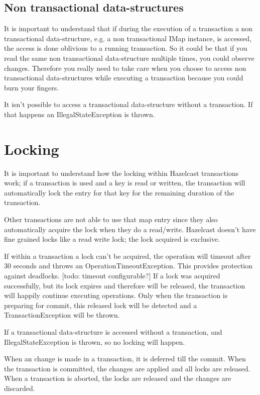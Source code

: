 \subsection*{Non transactional data-structures}
It is important to understand that if during the execution of a transaction a non transactional data-structure, e.g. a non transactional IMap instance, is accessed, the access is done oblivious to a running transaction. So it could be that if you read the same non transactional data-structure multiple times, you could observe changes. Therefore you really need to take care when you choose to access non transactional data-structures while executing a transaction because you could burn your fingers.

It isn't possible to access a transactional data-structure without a transaction. If that happens an IllegalStateException is thrown.

\section{Locking}
It is important to understand how the locking within Hazelcast transactions work; if a transaction is used and a key is read or written, the transaction will automatically lock the entry for that key for the remaining duration of the transaction. 


Other transactions are not able to use that map entry since they also automatically acquire the lock when they do a read/write. Hazelcast doesn't have fine grained locks like a read write lock; the lock acquired is exclusive.

If within a transaction a lock can't be acquired, the operation will timeout after 30 seconds and throws an OperationTimeoutException. This provides protection against deadlocks. [todo: timeout configurable?] If a lock was acquired successfully, but its lock expires and therefore will be released, the transaction will happily continue executing operations. Only when the transaction is preparing for commit, this released lock will be detected and a TransactionException will be thrown.

If a transactional data-structure is accessed without a transaction, and IllegalStateException is thrown, so no locking will happen. 

When an change is made in a transaction, it is deferred till the commit. When the transaction is committed, the changes are applied and all locks are released. When a transaction is aborted, the locks are released and the changes are discarded.

